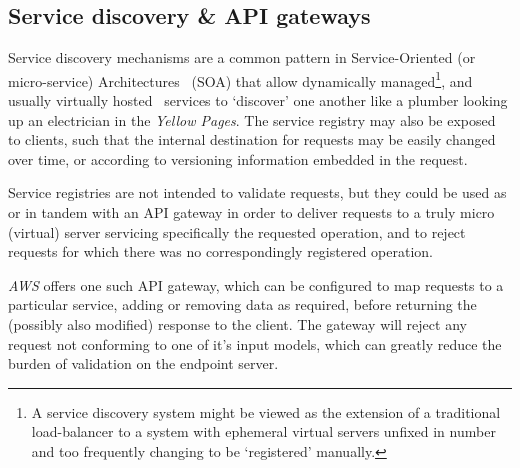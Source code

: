 \subsection{Service discovery \& API gateways} \label{soln:sd+apigw}

Service discovery mechanisms are a common pattern in Service-Oriented (or micro-service) Architectures~\cite{service_discovery_linkerd, service_discovery_consul, service_discovery_apache} (SOA) that allow dynamically managed\footnote{A service discovery system might be viewed as the extension of a traditional load-balancer to a system with ephemeral virtual servers unfixed in number and too frequently changing to be `registered' manually.}, and usually virtually hosted~\cite{service_discovery_nginx} services to `discover' one another like a plumber looking up an electrician in the \emph{Yellow Pages}. The service registry may also be exposed to clients, such that the internal destination for requests may be easily changed over time, or according to versioning information embedded in the request.

Service registries are not intended to validate requests, but they could be used as or in tandem with an API gateway in order to deliver requests to a truly micro (virtual) server servicing specifically the requested operation, and to reject requests for which there was no correspondingly registered operation. \cite{microservice_patterns}

\emph{AWS} offers one such API gateway, which can be configured to map requests to a particular service, adding or removing data as required, before returning the (possibly also modified) response to the client. The gateway will reject any request not conforming to one of it's input models, which can greatly reduce the burden of validation on the endpoint server. \cite{service_discovery_nginx, aws_apigw_docs}

